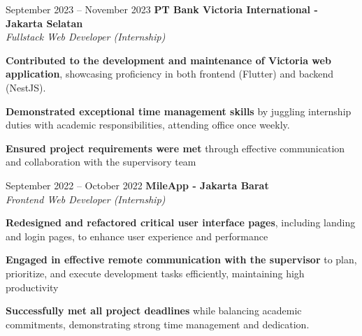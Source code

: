 \documentclass[../main.tex]{subfiles}
\begin{document}
\vspace{0.4 cm}

\begin{twocolentry}{
		September 2023 – November 2023}
	\textbf{PT Bank Victoria International \color{Gray} - Jakarta Selatan}\\
	\textit{Fullstack Web Developer (Internship)}
\end{twocolentry}

\vspace{0.10 cm}
\begin{onecolentry}
	\begin{highlights}
		\item \textbf{Contributed to the development and maintenance of Victoria web application}, showcasing proficiency in both frontend (Flutter) and backend (NestJS).
		\item \textbf{Demonstrated exceptional time management skills} by juggling internship duties with academic responsibilities, attending office once weekly.
		\item \textbf{Ensured project requirements were met} through effective communication and collaboration with the supervisory team
	\end{highlights}
\end{onecolentry}


\vspace{0.4 cm}

\begin{twocolentry}{
		September 2022 – October 2022}
	\textbf{MileApp \color{Gray} - Jakarta Barat}\\
	\textit{Frontend Web Developer (Internship)}
\end{twocolentry}

\vspace{0.10 cm}
\begin{onecolentry}
	\begin{highlights}
		\item \textbf{Redesigned and refactored critical user interface pages}, including landing and login pages, to enhance user experience and performance
		\item \textbf{Engaged in effective remote communication with the supervisor} to plan, prioritize, and execute development tasks efficiently, maintaining high productivity
		\item \textbf{Successfully met all project deadlines} while balancing academic commitments, demonstrating strong time management and dedication.
	\end{highlights}
\end{onecolentry}
\end{document}
